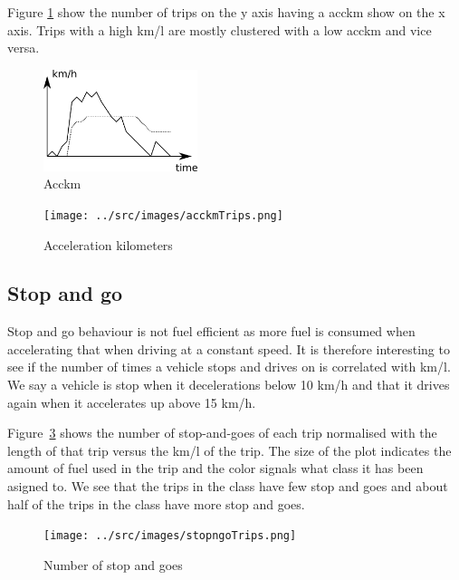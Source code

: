 Figure \ref{fig:acckm} show the number of trips on the y axis having a acckm show on the x axis. Trips with a high km/l are mostly clustered with a low acckm and vice versa. 

\begin{figure}[htb]
\centering
\includegraphics[width=0.4\textwidth]{../images/acckm.png}
\caption{Acckm}
\label{fig:acckm}
\end{figure}

\begin{figure}
\centering
\texttt{[image: ../src/images/acckmTrips.png]}
\caption{Acceleration kilometers}
\label{fig:acckmTrips}
\end{figure}

\subsection{Stop and go}
Stop and go behaviour is not fuel efficient as more fuel is consumed when accelerating that when driving at a constant speed.
It is therefore interesting to see if the number of times a vehicle stops and drives on is correlated with km/l.
We say a vehicle is stop when it decelerations below 10 km/h and that it drives again when it accelerates up above 15 km/h.


Figure~\ref{fig:stopngoTrips} shows the number of stop-and-goes of each trip normalised with the length of that trip versus the km/l of the trip.
The size of the plot indicates the amount of fuel used in the trip and the color signals what class it has been asigned to.
We see that the trips in the \fuelHigh class have few stop and goes and about half of the trips in the \fuelMedium class have more stop and goes.

\begin{figure}
\centering
\texttt{[image: ../src/images/stopngoTrips.png]}
\caption{Number of stop and goes}
\label{fig:stopngoTrips}
\end{figure}
